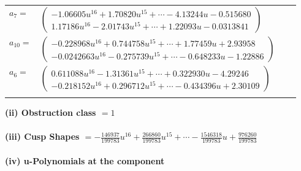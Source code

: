 \documentclass[1p]{elsarticle_modified}
\theoremstyle{definition}
\begin{document}
\begin{tabular}{m{7pt} m{180pt} m{7pt} m{180pt} }
\flushright $a_{7}=$&$\begin{pmatrix}-1.06605 u^{16}+1.70820 u^{15}+\cdots-4.13244 u-0.515680\\1.17186 u^{16}-2.01743 u^{15}+\cdots+1.22093 u-0.0313841\end{pmatrix}$ \\
\flushright $a_{10}=$&$\begin{pmatrix}-0.228968 u^{16}+0.744758 u^{15}+\cdots+1.77459 u+2.93958\\-0.0242663 u^{16}-0.275739 u^{15}+\cdots-0.648233 u-1.22886\end{pmatrix}$ \\
\flushright $a_{6}=$&$\begin{pmatrix}0.611088 u^{16}-1.31361 u^{15}+\cdots+0.322930 u-4.29246\\-0.218152 u^{16}+0.296712 u^{15}+\cdots-0.434396 u+2.30109\end{pmatrix}$\\&\end{tabular}
\flushleft \textbf{(ii) Obstruction class $= 1$}\\~\\
\flushleft \textbf{(iii) Cusp Shapes $= -\frac{146937}{199783} u^{16}+\frac{266860}{199783} u^{15}+\cdots-\frac{1546318}{199783} u+\frac{976260}{199783}$}\\~\\
\newpage\renewcommand{\arraystretch}{1}
\flushleft \textbf{(iv) u-Polynomials at the component}\newline \\
\end{document}
